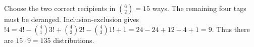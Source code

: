 Choose the two correct recipients in $\binom62=15$ ways. The remaining four tags must be deranged. Inclusion-exclusion gives $!4=4!-\binom413!+\binom422!-\binom431!+1=24-24+12-4+1=9$. Thus there are $\boxed{15\cdot9=135}$ distributions.
